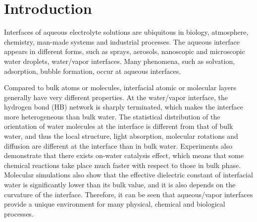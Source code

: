 \chapter{Introduction}\label{CHAPTER_1}
Interfaces of aqueous electrolyte solutions are ubiquitous in biology, atmosphere, chemistry, man-made systems 
and industrial processes\cite{Irwin88,Tobias1999, Benderskii00, 
Asahi2001,Benderskii02,Richmond2002,LiuH2004,
TianCS08,Yamamoto2008, Salmeron2009,ZhangLY2009,
LoNostro2012,Piatkowski2014,Balajka2018}.
The aqueous interface appears in different forms, such as sprays, aerosols, nanoscopic and  microscopic water droplets, water/vapor interfaces.
Many phenomena, such as solvation\cite{Benjamin1996}, adsorption\cite{Chang06}, bubble formation\cite{Craig1993,Craig1993b,Weissenborn1995,Marcelja04,Craig04},
occur at aqueous interfaces\cite{Ball2008,Kuo2004b}. 

Compared to bulk atoms or molecules, interfacial atomic or molecular layers generally have very different properties. 
At the water/vapor interface, the hydrogen bond (HB) network is sharply terminated, which makes the interface more heterogeneous 
than bulk water\cite{singh2013}. 
The statistical distribution of the orientation of water molecules at the interface is different from that of bulk water,
and thus the local structure, light absorption,  molecular rotations and diffusion are different at the interface than in bulk water\cite{Jedlovszky2004}.
Experiments also demonstrate that there exists on-water catalysis effect, which means that some chemical reactions take place much faster 
with respect to those in bulk phase\cite{Rideout1980,Narayan2005,Beattie2010}.
Molecular simulations also show that the effective dielectric constant of interfacial water is significantly lower than its bulk value, 
and it is also depends on the curvature of the interface\cite{Dinpajooh2016}. 
Therefore, it can be seen that aqueous/vapor interfaces provide a unique environment for many physical, chemical and biological processes. 

